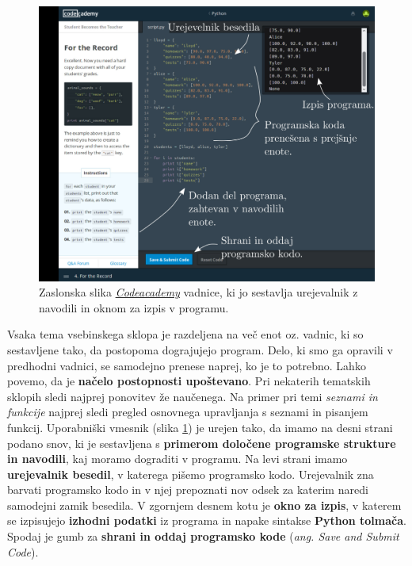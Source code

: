 \begin{figure}[h!]
  \centering
    \includegraphics [width=0.65\linewidth, keepaspectratio =
   1] {./images/sc_web/codeacademy_IDE_02.jpg}
   \caption{Zaslonska slika
     \emph{\href{https://www.codecademy.com/}{Codeacademy}}
     \cite{web:codeacademy} vadnice, ki jo sestavlja urejevalnik z
     navodili in oknom za izpis v programu.}
    \label{fig:scr:web:codeacademy:ide}
\end{figure}

Vsaka tema vsebinskega sklopa je razdeljena na več enot oz. vadnic, ki so
sestavljene tako, da postopoma dograjujejo program. Delo, ki smo ga opravili v
predhodni vadnici, se samodejno prenese naprej, ko je to potrebno. Lahko povemo,
da je \textbf{načelo postopnosti upoštevano}. Pri nekaterih tematskih sklopih
sledi najprej ponovitev že naučenega. Na primer pri temi \emph{seznami in
  funkcije} najprej sledi pregled osnovnega upravljanja s seznami in pisanjem
funkcij. Uporabniški vmesnik (slika \ref{fig:scr:web:codeacademy:ide}) je urejen
tako, da imamo na desni strani podano snov, ki je sestavljena s \textbf{primerom
  določene programske strukture in navodili}, kaj moramo dograditi v programu.
Na levi strani imamo \textbf{urejevalnik besedil}, v katerega pišemo programsko
kodo. Urejevalnik zna barvati programsko kodo in v njej prepoznati nov odsek za
katerim naredi samodejni zamik besedila. V zgornjem desnem kotu je \textbf{okno za
  izpis}, v katerem se izpisujejo \textbf{izhodni podatki} iz programa in napake
sintakse \textbf{Python tolmača}. Spodaj je gumb za \textbf{shrani in oddaj
  programsko kode} (\emph{ang. Save and Submit Code}).

